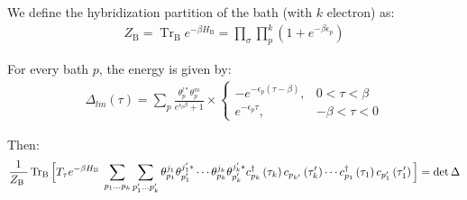\documentclass[10pt,letter]{article}
\begin{document}
We define the hybridization partition of the bath (with $k$ electron) as:
\begin{align}
Z_{\mathrm{B}}=\operatorname{Tr}_\mathrm B e^{-\beta H_{\mathrm{B}}}=\prod_{\sigma} \prod_{p}^k \left(1+e^{-\beta \epsilon_{p}}\right)
\end{align}

For every bath $p$, the energy is given by:
\begin{align}
\Delta_{l m}(\tau)=\sum_{p} \frac{\theta_{p}^{l *} \theta_{p}^{m}}{e^{\epsilon_{p} \beta}+1} \times\left\{\begin{array}{ll}
{-e^{-\epsilon_{p}(\tau-\beta)},} & {0<\tau<\beta} \\
{e^{-\epsilon_{p} \tau},} & {-\beta<\tau<0}
\end{array}\right.
\end{align}

Then:
\begin{align}
\label{eq_det_Hyb}
\frac{1}{Z_{\text {B }}} \operatorname{Tr_B}\Big[T_{\tau} e^{-\beta H_{\text {B }}} \sum_{p_1 \ldots p_k}  \sum_{p_{1}^{\prime} \ldots p_k^{\prime}} 
\theta_{p_{1}}^{j_{1}} \theta_{p_{1}^{\prime}}^{j_{1}^{\prime} *} \cdots \theta_{p_{k}}^{j_{k}} \theta_{p_{k}^{\prime}}^{j_{k}^{\prime}*}  
c_{p_{k}}^{\dagger}\left(\tau_{k}\right) c_{p_{k^{\prime}}}\left(\tau_{k}^{\prime}\right) \cdots c_{p_{1}}^{\dagger}\left(\tau_{1}\right) c_{p_{1}^{\prime}}\left(\tau_{1}^{\prime}\right)\Big]=\operatorname{det} \Delta
\end{align}
\end{document}

